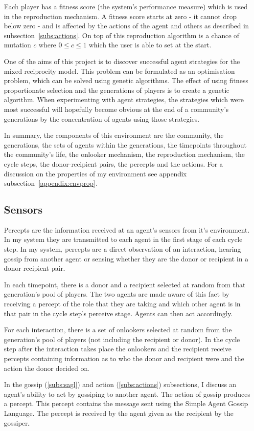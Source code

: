 \documentclass[]{final_report}
\begin{document}
Each player has a fitness score (the system's performance measure)  which is used in the reproduction mechanism. A fitness score starts at zero - it cannot drop below zero - and is affected by the actions of the agent and others as described in subsection~\ref{subs:actions}. On top of this reproduction algorithm is a chance of mutation $c$ where $0\le c\le 1$ which the user is able to set at the start.\par
One of the aims of this project is to discover successful agent strategies for the mixed reciprocity model. This problem can be formulated as an optimisation problem, which can be solved using genetic algorithms. The effect of using fitness proportionate selection and the generations of players is to create a genetic algorithm. When experimenting with agent strategies, the strategies which were most successful will hopefully become obvious at the end of a community's generations by the concentration of agents using those strategies.\par
In summary, the components of this environment are the community, the generations, the sets of agents within the generations, the timepoints throughout the community's life, the onlooker mechanism, the reproduction mechanism, the cycle steps, the donor-recipient pairs, the percepts and the actions. For a discussion on the properties of my environment see appendix subsection~\ref{appendix:envprop}.

\subsection{Sensors}
\label{subs:percepts}
Percepts are the information received at an agent's sensors from it's environment. In my system they are transmitted to each agent in the first stage of each cycle step. In my system, percepts are a direct observation of an interaction, hearing gossip from another agent or sensing whether they are the donor or recipient in a donor-recipient pair.\par
In each timepoint, there is a donor and a recipient selected at random from that generation's pool of players. The two agents are made aware of this fact by receiving a percept of the role that they are taking and which other agent is in that pair in the cycle step's perceive stage. Agents can then act accordingly.\par
For each interaction, there is a set of onlookers selected at random from the generation's pool of players (not including the recipient or donor). In the cycle step after the interaction takes place the onlookers and the recipient receive percepts containing information as to who the donor and recipient were and the action the donor decided on.\par
In the gossip (\ref{subs:sagl}) and action (\ref{subs:actions}) subsections, I discuss an agent's ability to act by gossiping to another agent. The action of gossip produces a percept. This percept contains the message sent using the Simple Agent Gossip Language. The percept is received by the agent given as the recipient by the gossiper.
\end{document}
